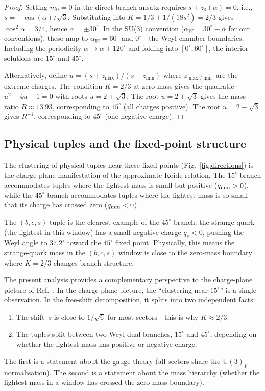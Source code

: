 \documentclass[preprint,12pt]{elsarticle}
\newcommand{\UU}{\mathrm{U}}
\begin{document}
\begin{proof}
Setting $m_0 = 0$ in the direct-branch ansatz requires
$s + z_0(\alpha) = 0$, i.e.,
$s = -\cos(\alpha)/\sqrt{3}$.
Substituting into $K = 1/3 + 1/(18s^2) = 2/3$ gives
$\cos^2\alpha = 3/4$, hence $\alpha = \pm 30^\circ$.
In the SU(3) convention ($\alpha_W = 30^\circ - \alpha$
for our conventions), these map to
$\alpha_W = 60^\circ$ and $0^\circ$---the Weyl chamber
boundaries.  Including the periodicity $\alpha \to \alpha + 120^\circ$
and folding into $[0^\circ, 60^\circ]$, the interior solutions
are $15^\circ$ and $45^\circ$.

Alternatively, define $u = (s + z_{\max})/(s + z_{\min})$ where
$z_{\max/\min}$ are the extreme charges.  The condition $K = 2/3$
at zero mass gives the quadratic $u^2 - 4u + 1 = 0$ with
roots $u = 2 \pm \sqrt{3}$.  The root $u = 2 + \sqrt{3}$ gives
the mass ratio $R \approx 13.93$, corresponding to $15^\circ$
(all charges positive).  The root $u = 2 - \sqrt{3}$ gives
$R^{-1}$, corresponding to $45^\circ$ (one negative charge).
\end{proof}

\subsection{Physical tuples and the fixed-point structure}

The clustering of physical tuples near these fixed points
(Fig.~\ref{fig:directions}) is the charge-plane manifestation
of the approximate Koide relation.  The $15^\circ$ branch
accommodates tuples where the lightest mass is small but
positive ($q_{\rm min} > 0$), while the $45^\circ$ branch
accommodates tuples where the lightest mass is so small that
its charge has crossed zero ($q_{\rm min} < 0$).

The $(b,c,s)$ tuple is the clearest example of the $45^\circ$
branch: the strange quark (the lightest in this window) has
a small negative charge $q_s < 0$, pushing the Weyl angle
to $37.2^\circ$ toward the $45^\circ$ fixed point.
Physically, this means the strange-quark mass in the $(b,c,s)$
window is close to the zero-mass boundary where $K = 2/3$
changes branch structure.

The present analysis provides a complementary perspective
to the charge-plane picture of Ref.~\cite{note98}.
In the charge-plane picture, the ``clustering near $15^\circ$''
is a single observation.  In the free-shift decomposition,
it splits into two independent facts:
\begin{enumerate}
\item The shift~$s$ is close to $1/\sqrt{6}$
  for most sectors---this is why $K \approx 2/3$.
\item The tuples split between two Weyl-dual branches,
  $15^\circ$ and $45^\circ$, depending on whether the
  lightest mass has positive or negative charge.
\end{enumerate}
The first is a statement about the gauge theory
(all sectors share the $\UU(3)_F$ normalisation).
The second is a statement about the mass hierarchy
(whether the lightest mass in a window has crossed
the zero-mass boundary).
\end{document}
